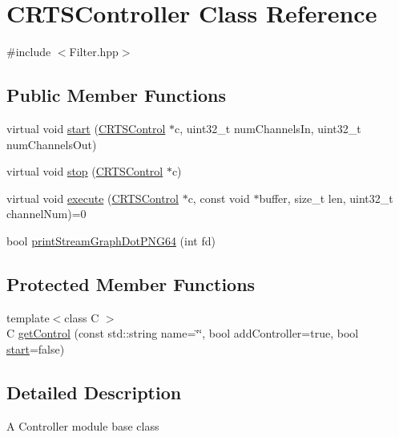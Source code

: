 \hypertarget{classCRTSController}{}\section{C\+R\+T\+S\+Controller Class Reference}
\label{classCRTSController}


{\ttfamily \#include $<$Filter.\+hpp$>$}

\subsection*{Public Member Functions}
\begin{DoxyCompactItemize}
\item 
virtual void \hyperlink{classCRTSController_a9065844e7c7aac10e26dad339ee65a8c}{start} (\hyperlink{classCRTSControl}{C\+R\+T\+S\+Control} $\ast$c, uint32\+\_\+t num\+Channels\+In, uint32\+\_\+t num\+Channels\+Out)
\item 
virtual void \hyperlink{classCRTSController_a883c09ddb21374753c3be0fc66f016fb}{stop} (\hyperlink{classCRTSControl}{C\+R\+T\+S\+Control} $\ast$c)
\item 
virtual void \hyperlink{classCRTSController_af9d93f0eee3c2d0969c6aaaaf94eb839}{execute} (\hyperlink{classCRTSControl}{C\+R\+T\+S\+Control} $\ast$c, const void $\ast$buffer, size\+\_\+t len, uint32\+\_\+t channel\+Num)=0
\item 
bool \hyperlink{classCRTSController_a7b167f03af923a194efecfc551015087}{print\+Stream\+Graph\+Dot\+P\+N\+G64} (int fd)
\end{DoxyCompactItemize}
\subsection*{Protected Member Functions}
\begin{DoxyCompactItemize}
\item 
{\footnotesize template$<$class C $>$ }\\C \hyperlink{classCRTSController_aa2b26a62c62fe5758ab5cc9104e96b56}{get\+Control} (const std\+::string name=\char`\"{}\char`\"{}, bool add\+Controller=true, bool \hyperlink{classCRTSController_a9065844e7c7aac10e26dad339ee65a8c}{start}=false)
\end{DoxyCompactItemize}


\subsection{Detailed Description}
A Controller module base class

